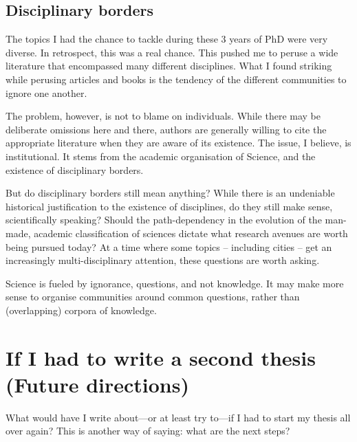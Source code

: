 \subsection{Disciplinary borders}
\label{sub:disciplinary_borders}


The topics I had the chance to tackle during these 3 years of PhD were very
diverse. In retrospect, this was a real chance. This pushed me to peruse a wide
literature that encompassed many different disciplines. What I found striking
while perusing articles and books is the tendency of the different communities to
ignore one another. 

The problem, however, is not to blame on individuals. While there may be
deliberate omissions here and there, authors are generally willing to cite the
appropriate literature when they are aware of its existence. The issue, I
believe, is institutional. It stems from the academic organisation of Science,
and the existence of disciplinary borders.

But do disciplinary borders still mean anything? While there is an undeniable
historical justification to the existence of disciplines, do they still make
sense, scientifically speaking? Should the path-dependency in the evolution of
the man-made, academic classification of sciences dictate what research avenues
are worth being pursued today? At a time where some topics -- including cities
-- get an increasingly multi-disciplinary attention, these questions are worth
asking.

Science is fueled by ignorance, questions, and not knowledge.
It may make more sense to organise communities around common questions, rather than
(overlapping) corpora of knowledge. 

\section{If I had to write a second thesis (Future directions)}
\label{sec:limitations}

What would have I write about---or at least try to---if I had to start my
thesis all over again? This is another way of saying: what are the next steps?\\

